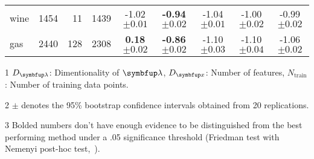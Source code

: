 \begin{table*}[t]
\begin{threeparttable}
\begin{tabular}{lrrrccccc}
    \textsf{wine} & 1454 & 11 & 1439 & {-1.02 {\scriptsize{\(\pm 0.01\)}}} & {\bf-0.94 {\scriptsize{\(\pm 0.02\)}}} & {-1.04 {\scriptsize{\(\pm 0.01\)}}} & {-1.00 {\scriptsize{\(\pm 0.02\)}}} & {-0.99 {\scriptsize{\(\pm 0.02\)}}} \\
    \textsf{gas} & 2440 & 128 & 2308 & {\bf{0.18} {\scriptsize{\(\pm 0.02\)}}} & {\bf-0.86 {\scriptsize{\(\pm 0.02\)}}} & {-1.10 {\scriptsize{\(\pm 0.03\)}}} & {-1.10 {\scriptsize{\(\pm 0.04\)}}} & {-1.06 {\scriptsize{\(\pm 0.02\)}}} 
    \\\bottomrule
  \end{tabular}
  \begin{tablenotes}
    \item[1] {\footnotesize \(D_{\vlambda}\): Dimentionality of \(\vlambda\), \(D_{\vx}\): Number of features, \(N_{\text{train}}\): Number of training data points.}
    \item[2] {\footnotesize \(\pm\) denotes the 95\% bootstrap confidence intervals obtained from 20 replications.}
    \item[3] {\footnotesize Bolded numbers don't have enough evidence to be distinguished from the best performing method under a .05 significance threshold (Friedman test with Nemenyi post-hoc test,~\citealt{JMLR:v7:demsar06a})}.
  \end{tablenotes}
  \end{threeparttable}
  \vspace{-2ex}
\end{table*}

